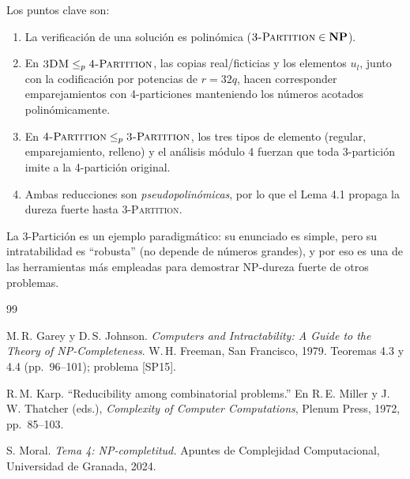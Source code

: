 \documentclass[12pt,a4paper]{article}
\theoremstyle{definition}
\theoremstyle{remark}
\newcommand{\TPART}{\textsc{3-Partition}}
\newcommand{\FPART}{\textsc{4-Partition}}
\newcommand{\DM}{\textsc{3DM}}
\begin{document}
Los puntos clave son:
\begin{enumerate}
  \item La verificación de una solución es polinómica ($\TPART \in \mathbf{NP}$).
  \item En $\DM \leq_p \FPART$, las copias real/ficticias y los elementos $u_l$,
        junto con la codificación por potencias de $r = 32q$, hacen corresponder
        emparejamientos con 4-particiones manteniendo los números acotados
        polinómicamente.
  \item En $\FPART \leq_p \TPART$, los tres tipos de elemento (regular,
        emparejamiento, relleno) y el análisis módulo 4 fuerzan que toda 3-partición
        imite a la 4-partición original.
  \item Ambas reducciones son \emph{pseudopolinómicas}, por lo que el Lema 4.1
        propaga la dureza fuerte hasta \TPART.
\end{enumerate}

La 3-Partición es un ejemplo paradigmático: su enunciado es simple, pero su
intratabilidad es ``robusta'' (no depende de números grandes), y por eso es una de
las herramientas más empleadas para demostrar NP-dureza fuerte de otros problemas.

\begin{thebibliography}{99}
\small

M.\,R. Garey y D.\,S. Johnson.
\textit{Computers and Intractability: A Guide to the Theory of NP-Completeness}.
W.\,H. Freeman, San Francisco, 1979. Teoremas 4.3 y 4.4 (pp.~96--101);
problema [SP15].

R.\,M. Karp.
``Reducibility among combinatorial problems.''
En R.\,E. Miller y J.\,W. Thatcher (eds.),
\textit{Complexity of Computer Computations}, Plenum Press, 1972, pp.~85--103.

S. Moral.
\textit{Tema 4: NP-completitud.} Apuntes de Complejidad Computacional,
Universidad de Granada, 2024.

\end{thebibliography}
\end{document}
